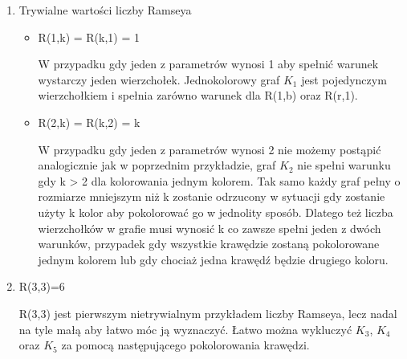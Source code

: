 \documentclass[11pt]{article}
\begin{document}
\begin{enumerate}
  \item Trywialne wartości liczby Ramseya \hfill 
  
  \begin{itemize}
  \item R(1,k) = R(k,1) = 1 \hfill \par
  W przypadku gdy jeden z parametrów wynosi 1 aby spełnić warunek wystarczy jeden wierzchołek.  Jednokolorowy graf $\mathit{K}_{1}$ jest pojedynczym wierzchołkiem i spełnia zarówno warunek dla R(1,b) oraz R(r,1). 
  
   \item R(2,k) = R(k,2) = k \hfill  \par
	W przypadku gdy jeden z parametrów wynosi 2 nie możemy postąpić analogicznie jak w poprzednim przykładzie, graf $\mathit{K}_{2}$ nie spełni warunku gdy k > 2 dla kolorowania jednym kolorem. Tak samo każdy graf pełny o rozmiarze mniejszym niż k zostanie odrzucony w sytuacji gdy zostanie użyty k kolor aby pokolorować go w jednolity sposób. Dlatego też liczba wierzchołków w grafie musi wynosić k co zawsze spełni jeden z dwóch warunków, przypadek gdy wszystkie krawędzie zostaną pokolorowane jednym kolorem lub gdy chociaż jedna krawędź będzie drugiego koloru.
  	
  \end{itemize}

  
 
  \item R(3,3)=6 \hfill \par
  R(3,3) jest pierwszym nietrywialnym przykładem liczby Ramseya, lecz nadal na tyle małą aby łatwo móc ją wyznaczyć. Łatwo można wykluczyć $\mathit{K}_{3}$, $\mathit{K}_{4}$ oraz $\mathit{K}_{5}$ za pomocą następującego pokolorowania krawędzi.


\begin{figure}[H]
  \centering
    \caption{}
 \end{figure}


\end{enumerate}
\end{document}
